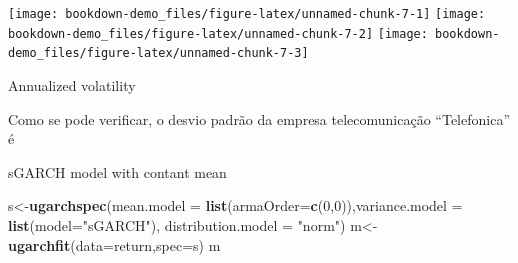 \documentclass[
  12pt,
  a4paper,
  openany]{book}
\newenvironment{Shaded}{\begin{snugshade}}{\end{snugshade}}
\newcommand{\CommentTok}[1]{\textcolor[rgb]{0.56,0.35,0.01}{\textit{#1}}}
\newcommand{\DataTypeTok}[1]{\textcolor[rgb]{0.13,0.29,0.53}{#1}}
\newcommand{\DecValTok}[1]{\textcolor[rgb]{0.00,0.00,0.81}{#1}}
\newcommand{\KeywordTok}[1]{\textcolor[rgb]{0.13,0.29,0.53}{\textbf{#1}}}
\newcommand{\NormalTok}[1]{#1}
\newcommand{\StringTok}[1]{\textcolor[rgb]{0.31,0.60,0.02}{#1}}
\begin{document}
\begin{center}\texttt{[image: bookdown-demo\_files/figure-latex/unnamed-chunk-7-1]} \texttt{[image: bookdown-demo\_files/figure-latex/unnamed-chunk-7-2]} \texttt{[image: bookdown-demo\_files/figure-latex/unnamed-chunk-7-3]} \end{center}
\normalsize

\scriptsize

\begin{Shaded}
\end{Shaded}

\normalsize

Annualized volatility
\scriptsize

\normalsize

Como se pode verificar, o desvio padrão da empresa telecomunicação ``Telefonica'' é

sGARCH model with contant mean

\begin{Shaded}
\begin{Highlighting}[]
\NormalTok{s\textless{}{-}}\KeywordTok{ugarchspec}\NormalTok{(}\DataTypeTok{mean.model =} \KeywordTok{list}\NormalTok{(}\DataTypeTok{armaOrder=}\KeywordTok{c}\NormalTok{(}\DecValTok{0}\NormalTok{,}\DecValTok{0}\NormalTok{)),}\DataTypeTok{variance.model =} \KeywordTok{list}\NormalTok{(}\DataTypeTok{model=}\StringTok{"sGARCH"}\NormalTok{),}
              \DataTypeTok{distribution.model =} \StringTok{"norm"}\NormalTok{)}
\NormalTok{m\textless{}{-}}\KeywordTok{ugarchfit}\NormalTok{(}\DataTypeTok{data=}\NormalTok{return,}\DataTypeTok{spec=}\NormalTok{s)}
\NormalTok{m}
\end{Highlighting}
\end{Shaded}
\end{document}
